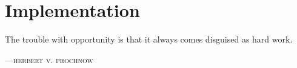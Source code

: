 %
%

\chapter{Implementation}
\epigraph{The trouble with opportunity is that it always comes disguised 
as hard work.}%
{\textsc{---herbert v. prochnow}}


